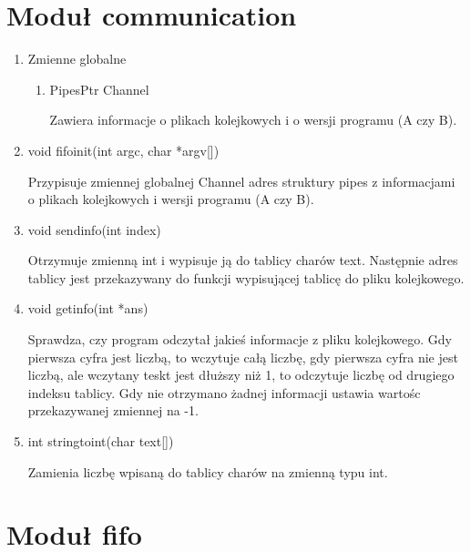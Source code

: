 \documentclass{article}
\begin{document}
\section{Moduł communication}

\begin{enumerate}

\item Zmienne globalne

\begin{enumerate}

\item PipesPtr Channel

Zawiera informacje o plikach kolejkowych i o wersji programu (A czy B).

\end{enumerate}

\item void fifo\textunderscore init(int argc, char *argv[])

Przypisuje zmiennej globalnej Channel adres struktury pipes z informacjami o plikach kolejkowych i wersji programu (A czy B).

\item void send\textunderscore info(int index)

Otrzymuje zmienną int i wypisuje ją do tablicy charów text. Następnie adres tablicy jest przekazywany do funkcji wypisującej tablicę do pliku kolejkowego.

\item void get\textunderscore info(int *ans)

Sprawdza, czy program odczytał jakieś informacje z pliku kolejkowego. Gdy pierwsza cyfra jest liczbą, to wczytuje całą liczbę, gdy pierwsza cyfra nie jest liczbą, ale wczytany teskt jest dłuższy niż 1, to odczytuje liczbę od drugiego indeksu tablicy. Gdy nie otrzymano żadnej informacji ustawia wartośc przekazywanej zmiennej na -1.

\item int string\textunderscore to\textunderscore int(char text[])

Zamienia liczbę wpisaną do tablicy charów na zmienną typu int.

\end{enumerate}

\section{Moduł fifo}
\end{document}
